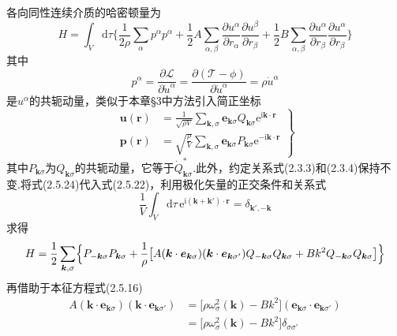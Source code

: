各向同性连续介质的哈密顿量为
\begin{equation}
  H=\int_V\mathrm{d}\tau\biggl\{\frac{1}{2\rho}\sum_{\alpha}p^{\alpha}p^{\alpha}
  +\frac{1}{2}A\sum_{\alpha,\beta}
  \frac{\partial u^{\alpha}}{\partial r_{\alpha}}\frac{\partial u^{\beta}}{\partial r_{\beta}}
  +\frac{1}{2}B\sum_{\alpha,\beta}
  \frac{\partial u^{\alpha}}{\partial r_{\beta}}\frac{\partial u^{\alpha}}{\partial r_{\beta}}\biggr\}
\end{equation}
其中
\begin{equation}
  p^{\alpha}=\frac{\partial\mathscr{L}}{\partial\dot{u}^{\alpha}}
  =\frac{\partial(\mathscr{T}-\phi)}{\partial\dot{u}^{\alpha}}
  =\rho\dot{u}^{\alpha}
\end{equation}
是$u^{\alpha}$的共轭动量，类似于本章§3中方法引入简正坐标
\begin{equation}
\left.\begin{aligned}
  \boldsymbol{u}(\boldsymbol{r})&=\frac{1}{\sqrt{\rho V}}
  \sum_{\boldsymbol{k},\sigma}\boldsymbol{e}_{\boldsymbol{k}\sigma}Q_{\boldsymbol{k}\sigma}
  \mathrm{e}^{\mathrm{i}\boldsymbol{k}\cdot\boldsymbol{r}}\\
  \boldsymbol{p}(\boldsymbol{r})&=\sqrt{\frac{\rho}{V}}
  \sum_{\boldsymbol{k},\sigma}\boldsymbol{e}_{\boldsymbol{k}\sigma}P_{\boldsymbol{k}\sigma}
  \mathrm{e}^{-\mathrm{i}\boldsymbol{k}\cdot\boldsymbol{r}}
\end{aligned}\right\}
\end{equation}
其中$P_{\boldsymbol{k}\sigma}$为$Q_{\boldsymbol{k}\sigma}$的共轭动量，它等于$\dot{Q}_{\boldsymbol{k}\sigma}^{*}$.此外，约定关系式(2.3.3)和(2.3.4)保持不变.将式(2.5.24)代入式(2.5.22)，利用极化矢量的正交条件和关系式
\begin{equation}
  \frac{1}{V}\int_V\mathrm{d}\tau\,
  \mathrm{e}^{\mathrm{i}(\boldsymbol{k}+\boldsymbol{k}')\cdot\boldsymbol{r}}
  =\delta_{\boldsymbol{k}',-\boldsymbol{k}}
\end{equation}
求得
\begin{equation*}
  H=\frac{1}{2}\sum_{\boldsymbol{k},\sigma}
  \Bigl\{P_{-\boldsymbol{k}\sigma}P_{\boldsymbol{k}\sigma}
  +\frac{1}{\rho}\bigl[A(\boldsymbol{k}\cdot\boldsymbol{e}_{\boldsymbol{k}\sigma})
  (\boldsymbol{k}\cdot\boldsymbol{e}_{\boldsymbol{k}\sigma'})
  Q_{-\boldsymbol{k}\sigma}Q_{\boldsymbol{k}\sigma}
  +Bk^2Q_{-\boldsymbol{k}\sigma}Q_{\boldsymbol{k}\sigma}\bigr]\Bigr\}
\end{equation*}
再借助于本征方程式(2.5.16)
\begin{equation}
\begin{aligned}
  A(\boldsymbol{k}\cdot\boldsymbol{e}_{\boldsymbol{k}\sigma})
  (\boldsymbol{k}\cdot\boldsymbol{e}_{\boldsymbol{k}\sigma'})
  &=\bigl[\rho\omega_{\sigma}^2(\boldsymbol{k})-Bk^2\bigr]
  (\boldsymbol{e}_{\boldsymbol{k}\sigma}\cdot\boldsymbol{e}_{\boldsymbol{k}\sigma'})\\
  &=\bigl[\rho\omega_{\sigma}^2(\boldsymbol{k})-Bk^2\bigr]\delta_{\sigma\sigma'}
\end{aligned}
\end{equation}
